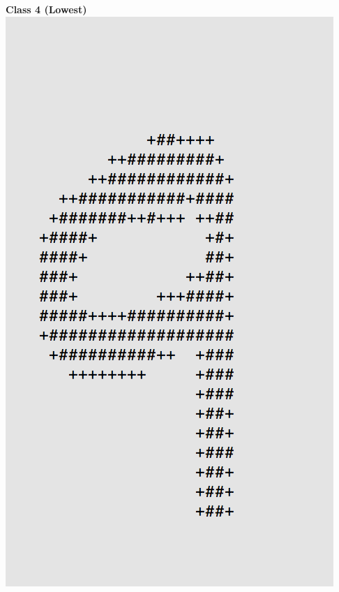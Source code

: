 \documentclass[11pt]{article}
\begin{document}
\begin{center}
\begin{multicols}{2}
\textbf{Class 4 (Lowest)}\\
\includegraphics[scale=0.4]{part1/1/low_4.png}
\end{multicols}
\end{center}
\break
\end{document}
